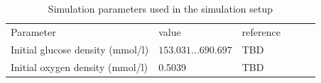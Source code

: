 \documentclass[a4paper,10pt]{article}
\begin{document}
% 
% 







\begin{table}[h]
\centering
\caption{Simulation parameters used in the simulation setup}
\label{tab:simulation_parameters_simulation_setup}
\begin{tabular}{llllll}
\rowcolor[HTML]{EFEFEF} 
\cellcolor[HTML]{EFEFEF} Parameter          & \cellcolor[HTML]{EFEFEF}value & \cellcolor[HTML]{EFEFEF}reference\\
Initial glucose density (mmol/l) & $153.031...690.697$ & TBD \\
Initial oxygen density (mmol/l)  & 0.5039 & TBD \cite{bubnik1995sugar}\\
\end{tabular}
\end{table}
\end{document}
